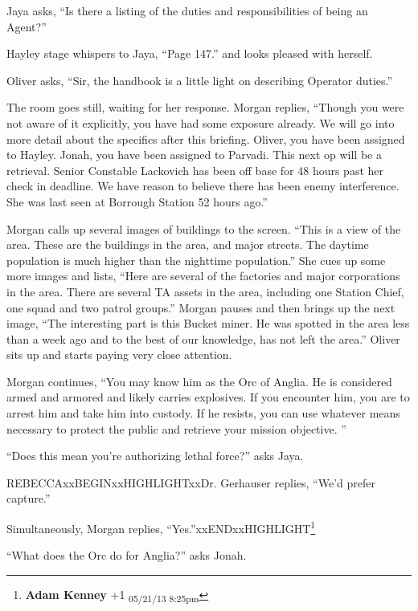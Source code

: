 Jaya asks, ``Is there a listing of the duties and responsibilities of being an Agent?''

Hayley stage whispers to Jaya, ``Page 147.''  and looks pleased with herself.

Oliver asks, ``Sir, the handbook is a little light on describing Operator duties.''

The room goes still, waiting for her response.  Morgan replies, ``Though you were not aware of it explicitly, you have had some exposure already.  We will go into more detail about the specifics after this briefing.  Oliver, you have been assigned to Hayley.  Jonah, you have been assigned to Parvadi.  This next op will be a retrieval.  Senior Constable Lackovich has been off base for 48 hours past her check in deadline.  We have reason to believe there has been enemy interference.  She was last seen at Borrough Station 52 hours ago.''



Morgan calls up several images of buildings to the screen.  ``This is a view of the area.  These are the buildings in the area, and major streets.  The daytime population is much higher than the nighttime population.''  She cues up some more images and lists, ``Here are several of the factories and major corporations in the area.  There are several TA assets in the area, including one Station Chief, one squad and two patrol groups.''  Morgan pauses and then brings up the next image, ``The interesting part is this Bucket miner.  He was spotted in the area less than a week ago and to the best of our knowledge, has not left the area.''  Oliver sits up and starts paying very close attention.



Morgan continues, ``You may know him as the Orc of Anglia.  He is considered armed and armored and likely carries explosives.  If you encounter him, you are to arrest him and take him into custody.  If he resists, you can use whatever means necessary to protect the public and retrieve your mission objective. ''

``Does this mean you're authorizing lethal force?'' asks Jaya.

REBECCAxxBEGINxxHIGHLIGHTxxDr. Gerhauser replies, ``We'd prefer capture.''

Simultaneously, Morgan replies, ``Yes.''xxENDxxHIGHLIGHT\footnote{\textbf{Adam Kenney }+1 \textsubscript{05/21/13 8:25pm}}

``What does the Orc do for Anglia?'' asks Jonah.

